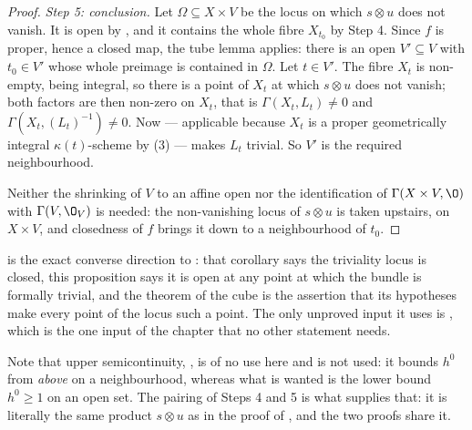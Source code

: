 \begin{proof}
\emph{Step 5: conclusion.}  Let $\Omega\subseteq X\times V$ be the locus on
which $s\otimes u$ does not vanish.  It is open by
, and it contains the whole fibre
$X_{t_0}$ by Step 4.  Since $f$ is proper, hence a closed map, the tube lemma
applies: there is an open $V'\subseteq V$ with $t_0\in V'$ whose whole preimage
is contained in $\Omega$.  Let $t\in V'$.  The fibre $X_t$ is non-empty, being
integral, so there is a point of $X_t$ at which $s\otimes u$ does not vanish;
both factors are then non-zero on $X_t$, that is $\Gamma(X_t,L_t)\neq0$ and
$\Gamma(X_t,(L_t)^{-1})\neq0$.  Now  ---
applicable because $X_t$ is a proper geometrically integral
$\kappa(t)$-scheme by (3) --- makes
$L_t$ trivial.  So $V'$ is the required neighbourhood.

Neither the shrinking of $V$ to an affine open nor the identification of
$\Gamma(X\times V,\O)$ with $\Gamma(V,\O_V)$ is needed: the non-vanishing locus
of $s\otimes u$ is taken upstairs, on $X\times V$, and closedness of $f$ brings
it down to a neighbourhood of $t_0$.
\end{proof}

\begin{remark}\label{rem:cube-formal-triviality}
 is the exact converse direction to
: that corollary says the triviality locus is
closed, this proposition says it is open at any point at which the bundle is
formally trivial, and the theorem of the cube is the assertion that its
hypotheses make every point of the locus such a point.  The only unproved
input it uses is , which is the one input of
the chapter that no other statement needs.

Note that upper semicontinuity, , is of no use
here and is not used: it bounds $h^0$ from \emph{above} on a neighbourhood,
whereas what is wanted is the lower bound $h^0\geq1$ on an open set.  The
pairing of Steps 4 and 5 is what supplies that: it is literally the same
product $s\otimes u$ as in the proof of
, and the two proofs share it.
\end{remark}

